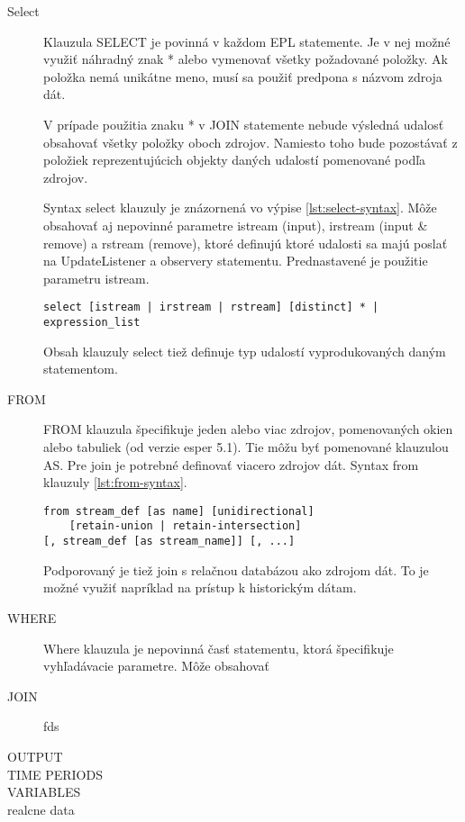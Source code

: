 		\begin{description}
			\item[Select] Klauzula SELECT je povinná v každom EPL statemente. Je v nej možné využiť náhradný znak * alebo vymenovať všetky požadované položky. Ak položka nemá unikátne meno, musí sa použiť predpona s názvom zdroja dát. 
			
			V prípade použitia znaku * v JOIN statemente nebude výsledná udalosť obsahovať všetky položky oboch zdrojov. Namiesto toho bude pozostávať z položiek reprezentujúcich objekty daných udalostí pomenované podľa zdrojov.
			
			Syntax select klauzuly je znázornená vo výpise \ref{lst:select-syntax}. Môže obsahovať aj nepovinné parametre istream (input), irstream (input \& remove) a rstream (remove), ktoré definujú ktoré udalosti sa majú poslať na UpdateListener a observery statementu. Prednastavené je použitie parametru istream.
					
			\begin{lstlisting}[label=lst:select-syntax]
select [istream | irstream | rstream] [distinct] * | expression_list
			\end{lstlisting}

			Obsah klauzuly select tiež definuje typ udalostí vyprodukovaných daným statementom.
			
			\item[FROM] FROM klauzula špecifikuje jeden alebo viac zdrojov, pomenovaných okien alebo tabuliek (od verzie esper 5.1). Tie môžu byť pomenované klauzulou AS. Pre join je potrebné definovať viacero zdrojov dát. Syntax from klauzuly \ref{lst:from-syntax}.

			\begin{lstlisting}[label=lst:from-syntax]
from stream_def [as name] [unidirectional]
	[retain-union | retain-intersection] 
[, stream_def [as stream_name]] [, ...]
			\end{lstlisting}
			Podporovaný je tiež join s relačnou databázou ako zdrojom dát. To je možné využiť napríklad na prístup k historickým dátam.
			
			\item[WHERE] Where klauzula je nepovinná časť statementu, ktorá špecifikuje vyhľadávacie parametre. Môže obsahovať 
			
			\item[JOIN] fds
			\item[OUTPUT] 
			\item[TIME PERIODS] 
			\item[VARIABLES] 
			\item[realcne data] 
		\end{description}
	
